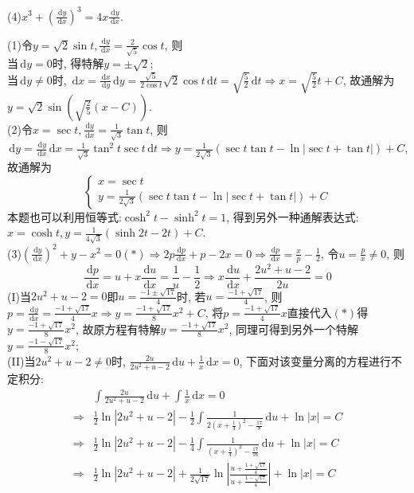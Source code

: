 \documentclass[titlepage,11pt,a4paper,twoside]{report}
\makeatletter
\newcommand\diff{\,\mathrm{d}}
\renewenvironment{proof}{\par
	\pushQED{\qed}%
	\normalfont \topsep1\p@\@plus6\p@\relax
	\trivlist
	\item\relax
	{\hspace*{\parindent}{\heiti 证明}\@addpunct{:}}\hspace\labelsep\ignorespaces
}{%
	\popQED\endtrivlist\@endpefalse
}
\makeatother
\begin{document}
(4)$\displaystyle x^3+\left(\frac{\diff y}{\diff x}\right)^3=4x\frac{\diff y}{\diff x}$.
\begin{proof} 
(1)令$y=\sqrt{2}\sin t,\frac{\diff y}{\diff x}=\frac{2}{\sqrt{5}}\cos t$, 则\\
当$\diff y=0$时, 得特解$y=\pm\sqrt{2}$;\\
当$\diff y\neq0$时, $\diff x=\frac{\diff x}{\diff y}\diff y=\frac{\sqrt{5}}{2\cos t}\sqrt{2}\cos t\diff t=\sqrt{\frac{5}{2}}\diff t\Rightarrow x=\sqrt{\frac{5}{2}}t+C$, 故通解为$y=\sqrt{2}\sin\left(\sqrt{\frac{2}{5}}(x-C)\right)$.\\
(2)令$x=\sec t,\frac{\diff y}{\diff x}=\frac{1}{\sqrt{3}}\tan t$, 则$\diff y=\frac{\diff y}{\diff x}\diff x=\frac{1}{\sqrt{3}}\tan^2t\sec t\diff t\Rightarrow y=\frac{1}{2\sqrt{3}}(\sec t\tan t-\ln|\sec t+\tan t|)+C$, 故通解为
\[\begin{cases}
x=\sec t\\y=\frac{1}{2\sqrt{3}}(\sec t\tan t-\ln|\sec t+\tan t|)+C
\end{cases}\]
本题也可以利用恒等式:$\cosh^2t-\sinh^2t=1$, 得到另外一种通解表达式: $x=\cosh t,y=\frac{1}{4\sqrt{3}}(\sinh2t-2t)+C$.\\
(3)$\displaystyle\left(\frac{\diff y}{\diff x}\right)^2+y-x^2=0(*)\Rightarrow2p\frac{\diff p}{\diff x}+p-2x=0\Rightarrow \frac{\diff p}{\diff x}=\frac{x}{p}-\frac{1}{2}$, 令$u=\frac{p}{x}\neq0$, 则
\[\frac{\diff p}{\diff x}=u+x\frac{\diff u}{\diff x}=\frac{1}{u}-\frac{1}{2}\Rightarrow x\frac{\diff u}{\diff x}+\frac{2u^2+u-2}{2u}=0\]
(I)当$2u^2+u-2=0$即$u=\frac{-1\pm\sqrt{17}}{4}$时, 若$u=\frac{-1+\sqrt{17}}{4}$, 则$p=\frac{\diff y}{\diff x}=\frac{-1+\sqrt{17}}{4}x\Rightarrow y=\frac{-1+\sqrt{17}}{8}x^2+C$, 将$p=\frac{-1+\sqrt{17}}{4}x$直接代入$(*)$得$y=\frac{-1+\sqrt{17}}{8}x^2$, 故原方程有特解$y=\frac{-1+\sqrt{17}}{8}x^2$, 同理可得到另外一个特解$y=\frac{-1-\sqrt{17}}{8}x^2$;\\
(II)当$2u^2+u-2\neq0$时, $\frac{2u}{2u^2+u-2}\diff u+\frac{1}{x}\diff x=0$, 下面对该变量分离的方程进行不定积分:
\[\begin{split}
&\int\frac{2u}{2u^2+u-2}\diff u+\int\frac{1}{x}\diff x=0\\
\Rightarrow&\frac{1}{2}\ln|2u^2+u-2|-\frac{1}{2}\int\frac{1}{2\left(x+\frac{1}{4}\right)^2-\frac{17}{8}}\diff u+\ln|x|=C\\
\Rightarrow&\frac{1}{2}\ln|2u^2+u-2|-\frac{1}{4}\int\frac{1}{\left(x+\frac{1}{4}\right)^2-\frac{17}{16}}\diff u+\ln|x|=C\\
\Rightarrow&\frac{1}{2}\ln|2u^2+u-2|+\frac{1}{2\sqrt{17}}\ln\left|\frac{u+\frac{1+\sqrt{17}}{4}}{u+\frac{1-\sqrt{17}}{4}}\right|+\ln|x|=C\\

\end{split}\]
\end{proof}
\end{document}

